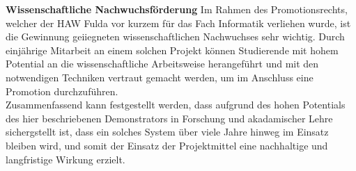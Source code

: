 \documentclass[11pt]{article}
\begin{document}
\textbf{Wissenschaftliche Nachwuchsförderung} Im Rahmen des Promotionsrechts, welcher der HAW Fulda vor kurzem für das Fach Informatik verliehen wurde, ist die Gewinnung geiiegneten wissenschaftlichen Nachwuchses sehr wichtig. Durch einjährige Mitarbeit an einem solchen Projekt können Studierende mit hohem Potential an die wissenschaftliche Arbeitsweise herangeführt und mit den notwendigen Techniken vertraut gemacht werden, um im Anschluss eine Promotion durchzuführen.\\

Zusammenfassend kann festgestellt werden, dass aufgrund des hohen Potentials des hier beschriebenen Demonstrators in Forschung und akadamischer Lehre sichergstellt ist, dass ein solches System über viele Jahre hinweg im Einsatz bleiben wird, und somit der Einsatz der Projektmittel eine nachhaltige und langfristige Wirkung erzielt.
%

\newpage
\renewcommand{\thesection}{7}
\end{document}
